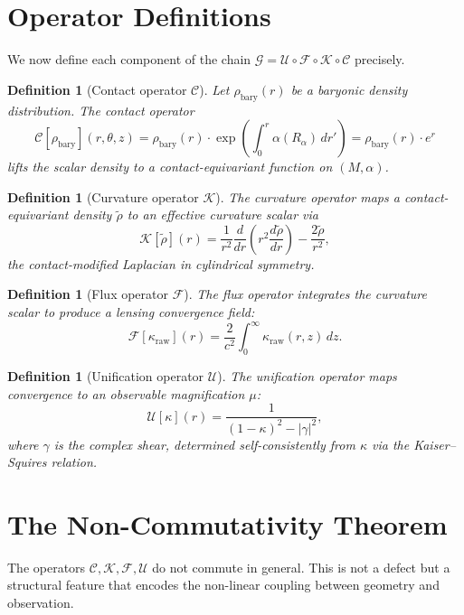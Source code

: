 \documentclass[11pt,a4paper,openright]{book}
\theoremstyle{dm3thm}
\theoremstyle{dm3def}
\newtheorem{definition}[theorem]{Definition}
\newcommand{\Ralf}{R_\alpha}
\newcommand{\GG}{\mathcal{G}}
\newcommand{\UU}{\mathcal{U}}
\newcommand{\FF}{\mathcal{F}}
\newcommand{\KK}{\mathcal{K}}
\newcommand{\CC}{\mathcal{C}}
\begin{document}
\section{Operator Definitions}

We now define each component of the chain $\GG = \UU\circ\FF\circ\KK\circ\CC$
precisely.

\begin{definition}[Contact operator $\CC$]
Let $\rho_{\mathrm{bary}}(r)$ be a baryonic density distribution.  The contact
operator
\[
  \CC[\rho_{\mathrm{bary}}](r,\theta,z)
  = \rho_{\mathrm{bary}}(r)\cdot\exp\!\left(\int_0^r \alpha(\Ralf)\,dr'\right)
  = \rho_{\mathrm{bary}}(r)\cdot e^r
\]
lifts the scalar density to a contact-equivariant function on $(M,\alpha)$.
\end{definition}

\begin{definition}[Curvature operator $\KK$]
The curvature operator maps a contact-equivariant density $\tilde\rho$ to an
effective curvature scalar via
\[
  \KK[\tilde\rho](r) = \frac{1}{r^2}\frac{d}{dr}\!\left(r^2\frac{d\tilde\rho}{dr}\right)
  - \frac{2\tilde\rho}{r^2},
\]
the contact-modified Laplacian in cylindrical symmetry.
\end{definition}

\begin{definition}[Flux operator $\FF$]
The flux operator integrates the curvature scalar to produce a lensing
convergence field:
\[
  \FF[\kappa_{\mathrm{raw}}](r)
  = \frac{2}{c^2}\int_0^\infty \kappa_{\mathrm{raw}}(r,z)\,dz.
\]
\end{definition}

\begin{definition}[Unification operator $\UU$]
The unification operator maps convergence to an observable magnification
$\mu$:
\[
  \UU[\kappa](r)
  = \frac{1}{(1-\kappa)^2 - |\gamma|^2},
\]
where $\gamma$ is the complex shear, determined self-consistently from $\kappa$
via the Kaiser--Squires relation.
\end{definition}

\section{The Non-Commutativity Theorem}
\label{sec:noncomm}

The operators $\CC,\KK,\FF,\UU$ do not commute in general.  This is not a
defect but a structural feature that encodes the non-linear coupling between
geometry and observation.
\end{document}
